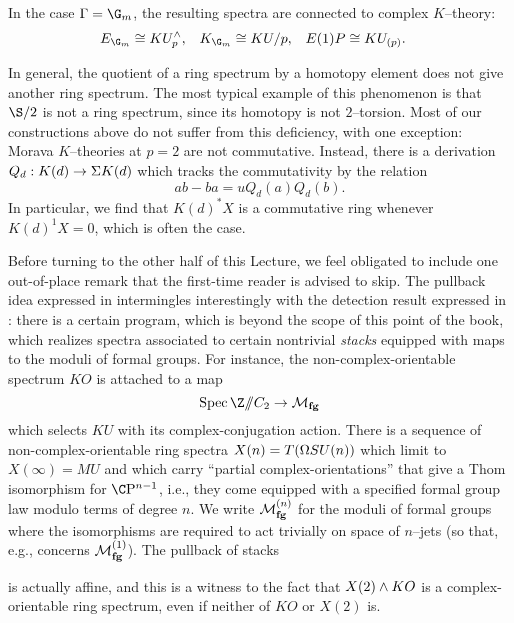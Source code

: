 \begin{example}\label{ExampleOfMoravasTheoriesAtGm}
In the case $\Gamma = \G_m$, the resulting spectra are connected to complex $K$--theory:
\begin{align*}
E_{\G_m} & \cong KU^\wedge_p, &
K_{\G_m} & \cong KU / p, &
E(1)P & \cong KU_{(p)}.
\end{align*}
\end{example}

\begin{remark}\label{MoravaKIsNotCommutative}
In general, the quotient of a ring spectrum by a homotopy element does not give another ring spectrum.  The most typical example of this phenomenon is that $\S/2$ is not a ring spectrum, since its homotopy is not $2$--torsion.  Most of our constructions above do not suffer from this deficiency, with one exception: Morava $K$--theories at $p = 2$ are not commutative.  Instead, there is a derivation $Q_d: K(d) \to \Sigma K(d)$ which tracks the commutativity by the relation \[ab - ba = u Q_d(a) Q_d(b).\]  In particular, we find that $K(d)^* X$ is a commutative ring whenever $K(d)^1 X = 0$, which is often the case.
\end{remark}

\begin{remark}
Before turning to the other half of this Lecture, we feel obligated to include one out-of-place remark that the first-time reader is advised to skip.  The pullback idea expressed in  intermingles interestingly with the detection result expressed in : there is a certain program, which is beyond the scope of this point of the book, which realizes spectra associated to certain nontrivial \emph{stacks} equipped with maps to the moduli of formal groups.  For instance, the non-complex-orientable spectrum $KO$ is attached to a map \[\Spec \Z \mmod C_2 \to \moduli{fg}\] which selects $KU$ with its complex-conjugation action.  There is a sequence of non-complex-orientable ring spectra $X(n) = T(\Omega SU(n))$ which limit to $X(\infty) = MU$ and which carry ``partial complex-orientations'' that give a Thom isomorphism for $\CP^{n-1}$, i.e., they come equipped with a specified formal group law modulo terms of degree $n$.  We write $\mathcal{M}_{\mathbf{fg}}^{(n)}$ for the moduli of formal groups where the isomorphisms are required to act trivially on space of $n$--jets (so that, e.g.,  concerns $\mathcal{M}_{\mathbf{fg}}^{(1)}$).  The pullback of stacks
\begin{center}
\end{center}
is actually affine, and this is a witness to the fact that $X(2) \wedge KO$ is a complex-orientable ring spectrum, even if neither of $KO$ or $X(2)$ is.
\end{remark}

